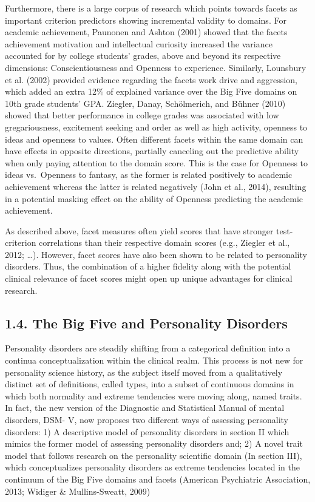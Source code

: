 \documentclass[man]{apa6}
\theoremstyle{definition}
\theoremstyle{definition}
\theoremstyle{definition}
\theoremstyle{remark}
\begin{document}
Furthermore, there is a large corpus of research which points towards
facets as important criterion predictors showing incremental validity to
domains. For academic achievement, Paunonen and Ashton (2001) showed
that the facets achievement motivation and intellectual curiosity
increased the variance accounted for by college students' grades, above
and beyond its respective dimensions: Conscientiousness and Openness to
experience. Similarly, Lounsbury et al. (2002) provided evidence
regarding the facets work drive and aggression, which added an extra
12\% of explained variance over the Big Five domains on 10th grade
students' GPA. Ziegler, Danay, Schölmerich, and Bühner (2010) showed
that better performance in college grades was associated with low
gregariousness, excitement seeking and order as well as high activity,
openness to ideas and openness to values. Often different facets within
the same domain can have effects in opposite directions, partially
canceling out the predictive ability when only paying attention to the
domain score. This is the case for Openness to ideas vs.~Openness to
fantasy, as the former is related positively to academic achievement
whereas the latter is related negatively (John et al., 2014), resulting
in a potential masking effect on the ability of Openness predicting the
academic achievement.

As described above, facet measures often yield scores that have stronger
test-criterion correlations than their respective domain scores (e.g.,
Ziegler et al., 2012; \ldots{}). However, facet scores have also been
shown to be related to personality disorders. Thus, the combination of a
higher fidelity along with the potential clinical relevance of facet
scores might open up unique advantages for clinical research.

\hypertarget{the-big-five-and-personality-disorders}{%
\subsection{1.4. The Big Five and Personality
Disorders}\label{the-big-five-and-personality-disorders}}

Personality disorders are steadily shifting from a categorical
definition into a continua conceptualization within the clinical realm.
This process is not new for personality science history, as the subject
itself moved from a qualitatively distinct set of definitions, called
types, into a subset of continuous domains in which both normality and
extreme tendencies were moving along, named traits. In fact, the new
version of the Diagnostic and Statistical Manual of mental disorders,
DSM- V, now proposes two different ways of assessing personality
disorders: 1) A descriptive model of personality disorders in section II
which mimics the former model of assessing personality disorders and; 2)
A novel trait model that follows research on the personality scientific
domain (In section III), which conceptualizes personality disorders as
extreme tendencies located in the continuum of the Big Five domains and
facets (American Psychiatric Association, 2013; Widiger \&
Mullins-Sweatt, 2009)
\end{document}
